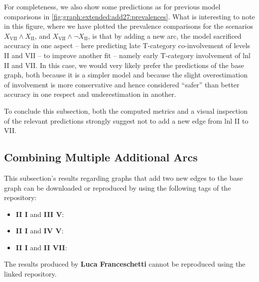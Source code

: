 \documentclass[\relativeRoot/main.tex]{subfiles}
\begin{document}
For completeness, we also show some predictions as for previous model comparisons in \cref{fig:graph:extended:add27:prevalences}. What is interesting to note in this figure, where we have plotted the prevalence comparisons for the scenarios $X_\text{VII} \land X_\text{II}$, and $X_\text{VII} \land \lnot X_\text{II}$, is that by adding a new arc, the model sacrificed accuracy in one aspect -- here predicting late T-category co-involvement of levels II and VII -- to improve another fit -- namely early T-category involvement of \gls{lnl} II and VII. In this case, we would very likely prefer the predictions of the base graph, both because it is a simpler model and because the slight overestimation of involvement is more conservative and hence considered ``safer'' than better accuracy in one respect and underestimation in another.

To conclude this subsection, both the computed metrics and a visual inspection of the relevant predictions strongly suggest not to add a new edge from \gls{lnl} II to VII.

\subsection{Combining Multiple Additional Arcs}
\label{subsec:graph:extended:multiple}



\begin{tcolorbox}[title=\faIcon{recycle} Reproducibility, parbox=false]
    This subsection's results regarding graphs that add two new edges to the base graph can be downloaded or reproduced by using the following tags of the  repository:

    \begin{itemize}
        \item \textbf{II  I} and \textbf{III  V}: 
        \item \textbf{II  I} and \textbf{IV  V}: 
        \item \textbf{II  I} and \textbf{II  VII}: 
    \end{itemize}

    The results produced by  \textbf{Luca Franceschetti} \cite{franceschetti_comparison_2022} cannot be reproduced using the linked repository.
\end{tcolorbox}
\end{document}
